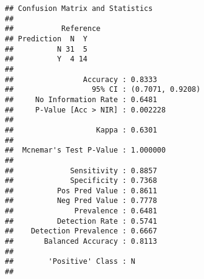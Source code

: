 \documentclass[
]{article}
\newenvironment{Shaded}{\begin{snugshade}}{\end{snugshade}}
\newcommand{\AttributeTok}[1]{\textcolor[rgb]{0.13,0.29,0.53}{#1}}
\newcommand{\CommentTok}[1]{\textcolor[rgb]{0.56,0.35,0.01}{\textit{#1}}}
\newcommand{\FloatTok}[1]{\textcolor[rgb]{0.00,0.00,0.81}{#1}}
\newcommand{\FunctionTok}[1]{\textcolor[rgb]{0.13,0.29,0.53}{\textbf{#1}}}
\newcommand{\NormalTok}[1]{#1}
\newcommand{\OtherTok}[1]{\textcolor[rgb]{0.56,0.35,0.01}{#1}}
\newcommand{\SpecialCharTok}[1]{\textcolor[rgb]{0.81,0.36,0.00}{\textbf{#1}}}
\newcommand{\StringTok}[1]{\textcolor[rgb]{0.31,0.60,0.02}{#1}}
\begin{document}
\begin{Shaded}
\end{Shaded}

\begin{verbatim}
## Confusion Matrix and Statistics
## 
##           Reference
## Prediction  N  Y
##          N 31  5
##          Y  4 14
##                                           
##                Accuracy : 0.8333          
##                  95% CI : (0.7071, 0.9208)
##     No Information Rate : 0.6481          
##     P-Value [Acc > NIR] : 0.002228        
##                                           
##                   Kappa : 0.6301          
##                                           
##  Mcnemar's Test P-Value : 1.000000        
##                                           
##             Sensitivity : 0.8857          
##             Specificity : 0.7368          
##          Pos Pred Value : 0.8611          
##          Neg Pred Value : 0.7778          
##              Prevalence : 0.6481          
##          Detection Rate : 0.5741          
##    Detection Prevalence : 0.6667          
##       Balanced Accuracy : 0.8113          
##                                           
##        'Positive' Class : N               
## 
\end{verbatim}
\end{document}
